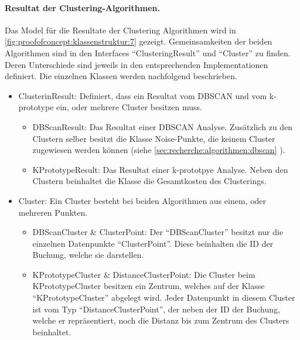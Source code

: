 \paragraph{Resultat der Clustering-Algorithmen.} Das Model für die Resultate der Clustering Algorithmen wird in \cref{fig:proofofconcept:klassenstruktur:7} gezeigt. Gemeinsamkeiten der beiden Algorithmen sind in den Interfaces "`ClusteringResult"' und "`Cluster"' zu finden. Deren Unterschiede sind jeweils in den entsprechenden Implementationen definiert. Die einzelnen Klassen werden nachfolgend beschrieben.
\begin{itemize}
	\item ClusterinResult: Definiert, dass ein Resultat vom DBSCAN und vom k-prototype ein, oder mehrere Cluster besitzen muss.
	\begin{itemize}  
		\item DBScanResult: Das Resultat einer DBSCAN Analyse. Zusätzlich zu den Clustern selber besitzt die Klasse Noise-Punkte, die keinem Cluster zugewiesen werden können (siehe \cref{sec:recherche:algorithmen:dbscan} ).
		\item KPrototypeResult: Das Resultat einer k-prototpye Analyse. Neben den Clustern beinhaltet die Klasse die Gesamtkosten des Clusterings.
	\end{itemize}  
	\item Cluster: Ein Cluster besteht bei beiden Algorithmen aus einem, oder mehreren Punkten.
		\begin{itemize}  
			\item DBScanCluster \& ClusterPoint: Der "`DBScanCluster"' besitzt nur die einzelnen Datenpunkte "`ClusterPoint"'. Diese beinhalten die ID der Buchung, welche sie darstellen.
			\item KPrototypeCluster \& DistanceClusterPoint: Die Cluster beim KPrototypeCluster besitzen ein Zentrum, welches auf der Klasse "`KPrototypeCluster"' abgelegt wird. Jeder Datenpunkt in diesem Cluster ist vom Typ "`DistanceClusterPoint"', der neben der ID der Buchung, welche er repräsentiert, noch die Distanz bis zum Zentrum des Clusters beinhaltet.
		\end{itemize}  
\end{itemize}  



